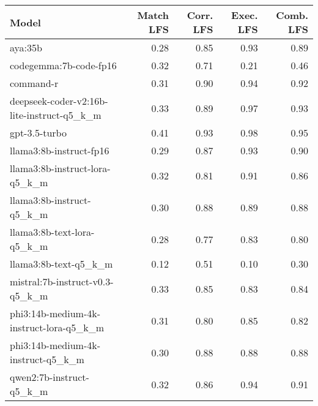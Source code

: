 \begin{tabular}{lrrrr}
\toprule
Model & Match LFS & Corr. LFS & Exec. LFS & Comb. LFS \\
\midrule
aya:35b & 0.28 & 0.85 & 0.93 & 0.89 \\
codegemma:7b-code-fp16 & 0.32 & 0.71 & 0.21 & 0.46 \\
command-r & 0.31 & 0.90 & 0.94 & 0.92 \\
deepseek-coder-v2:16b-lite-instruct-q5\_k\_m & 0.33 & 0.89 & 0.97 & 0.93 \\
gpt-3.5-turbo & 0.41 & 0.93 & 0.98 & 0.95 \\
llama3:8b-instruct-fp16 & 0.29 & 0.87 & 0.93 & 0.90 \\
llama3:8b-instruct-lora-q5\_k\_m & 0.32 & 0.81 & 0.91 & 0.86 \\
llama3:8b-instruct-q5\_k\_m & 0.30 & 0.88 & 0.89 & 0.88 \\
llama3:8b-text-lora-q5\_k\_m & 0.28 & 0.77 & 0.83 & 0.80 \\
llama3:8b-text-q5\_k\_m & 0.12 & 0.51 & 0.10 & 0.30 \\
mistral:7b-instruct-v0.3-q5\_k\_m & 0.33 & 0.85 & 0.83 & 0.84 \\
phi3:14b-medium-4k-instruct-lora-q5\_k\_m & 0.31 & 0.80 & 0.85 & 0.82 \\
phi3:14b-medium-4k-instruct-q5\_k\_m & 0.30 & 0.88 & 0.88 & 0.88 \\
qwen2:7b-instruct-q5\_k\_m & 0.32 & 0.86 & 0.94 & 0.91 \\
\bottomrule
\end{tabular}
